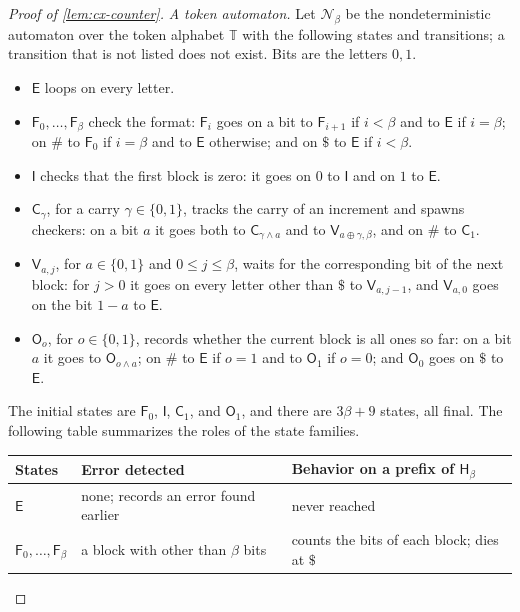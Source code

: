 \begin{proof}[Proof of \cref{lem:cx-counter}]
\emph{A token automaton.} Let $\mathcal N_\beta$ be the nondeterministic
automaton over the token alphabet $\mathbb T$ with the following states and transitions; a transition that
is not listed does not exist. Bits are the letters $0,1$.
\begin{itemize}[leftmargin=*]
\item $\mathsf E$ loops on every letter.
\item $\mathsf F_0,\ldots,\mathsf F_\beta$ check the format: $\mathsf F_i$ goes on a
  bit to $\mathsf F_{i+1}$ if $i<\beta$ and to $\mathsf E$ if $i=\beta$; on $\#$ to
  $\mathsf F_0$ if $i=\beta$ and to $\mathsf E$ otherwise; and on $\$$ to $\mathsf E$
  if $i<\beta$.
\item $\mathsf I$ checks that the first block is zero: it goes on $0$ to
  $\mathsf I$ and on $1$ to $\mathsf E$.
\item $\mathsf C_\gamma$, for a carry $\gamma\in\{0,1\}$, tracks the carry of an
  increment and spawns checkers: on a bit $a$ it goes both to
  $\mathsf C_{\gamma\wedge a}$ and to $\mathsf V_{a\oplus\gamma,\beta}$, and on $\#$ to
  $\mathsf C_1$.
\item $\mathsf V_{a,j}$, for $a\in\{0,1\}$ and $0\le j\le\beta$, waits for the
  corresponding bit of the next block: for $j>0$ it goes on every letter other
  than $\$$ to $\mathsf V_{a,j-1}$, and $\mathsf V_{a,0}$ goes on the bit $1-a$ to
  $\mathsf E$.
\item $\mathsf O_o$, for $o\in\{0,1\}$, records whether the current block is all
  ones so far: on a bit $a$ it goes to $\mathsf O_{o\wedge a}$; on $\#$ to
  $\mathsf E$ if $o=1$ and to $\mathsf O_1$ if $o=0$; and $\mathsf O_0$ goes on $\$$
  to $\mathsf E$.
\end{itemize}
The initial states are $\mathsf F_0$, $\mathsf I$, $\mathsf C_1$, and $\mathsf O_1$, and
there are $3\beta+9$ states, all final. The following table summarizes the
roles of the state families.
\begin{center}
\small
\begin{tabular}{@{}lp{.36\linewidth}p{.36\linewidth}@{}}
\toprule
States & Error detected & Behavior on a prefix of $\mathsf H_\beta$\\
\midrule
$\mathsf E$ & none; records an error found earlier & never reached\\
$\mathsf F_0,\ldots,\mathsf F_\beta$ & a block with other than $\beta$ bits & counts the bits of each block; dies at $\$$\\

\end{tabular}
\end{center}
\end{proof}
